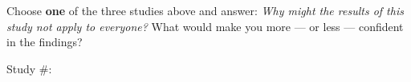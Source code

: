 \documentclass[10pt]{article}
\begin{document}
\vspace{0.14in}

\begin{reflectionbox}
\small Choose \textbf{one} of the three studies above and answer:
\textit{Why might the results of this study not apply to everyone?}
What would make you more --- or less --- confident in the findings?

\vspace{6pt}
\textcolor{slate}{\scriptsize Study \#:\;\blank{0.6cm}}

\vspace{4pt}
\writeline\\[1pt]\writeline\\[1pt]\writeline\\[1pt]\writeline
\end{reflectionbox}

\vspace{0.14in}
\end{document}
